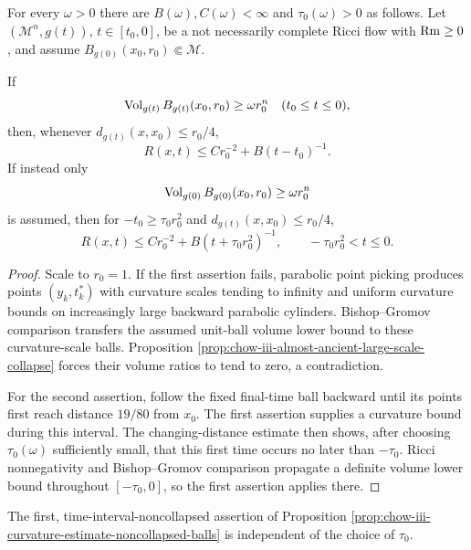 \begin{proposition}
\label{prop:chow-iii-curvature-estimate-noncollapsed-balls}


For every $\omega>0$ there are $B(\omega),C(\omega)<\infty$ and
$\tau_0(\omega)>0$ as follows.  Let $(\mathcal M^n,g(t))$,
$t\in[t_0,0]$, be a not necessarily complete Ricci flow with $\operatorname{Rm}\ge0$, and
assume $B_{g(0)}(x_0,r_0)\Subset\mathcal M$.

If
\[
 \operatorname{Vol}_{g(t)}B_{g(t)}(x_0,r_0)\ge\omega r_0^n
 \quad(t_0\le t\le0),
\]
then, whenever $d_{g(t)}(x,x_0)\le r_0/4$,
\[
 R(x,t)\le C r_0^{-2}+B(t-t_0)^{-1}.
\]
If instead only
\[
 \operatorname{Vol}_{g(0)}B_{g(0)}(x_0,r_0)\ge\omega r_0^n
\]
is assumed, then for $-t_0\ge\tau_0r_0^2$ and
$d_{g(t)}(x,x_0)\le r_0/4$,
\[
 R(x,t)\le C r_0^{-2}+B(t+\tau_0r_0^2)^{-1},
 \qquad -\tau_0r_0^2<t\le0.
\]
\end{proposition}
\begin{proof}
\sketch Scale to $r_0=1$.  If the first assertion fails, parabolic point picking
produces points $(y_k,t_k^*)$ with curvature scales tending to infinity and
uniform curvature bounds on increasingly large backward parabolic
cylinders.  Bishop--Gromov comparison transfers the assumed unit-ball volume
lower bound to these curvature-scale balls.  Proposition
\ref{prop:chow-iii-almost-ancient-large-scale-collapse} forces their volume
ratios to tend to zero, a contradiction.

For the second assertion, follow the fixed final-time ball backward until its
points first reach distance $19/80$ from $x_0$.  The first assertion supplies
a curvature bound during this interval.  The changing-distance estimate then
shows, after choosing $\tau_0(\omega)$ sufficiently small, that this first
time occurs no later than $-\tau_0$.  Ricci nonnegativity and Bishop--Gromov
comparison propagate a definite volume lower bound throughout
$[-\tau_0,0]$, so the first assertion applies there.
\end{proof}

\begin{remark}
\label{rem:chow-iii-curvature-estimate-time-independent}

The first, time-interval-noncollapsed assertion of Proposition
\ref{prop:chow-iii-curvature-estimate-noncollapsed-balls} is independent of
the choice of $\tau_0$.
\end{remark}

